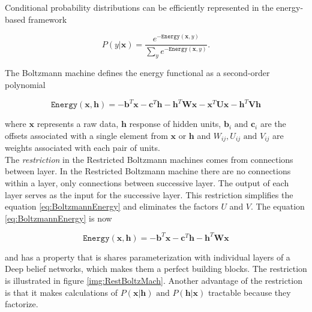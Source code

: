 Conditional probability distributions can be efficiently represented in the energy-based framework

\begin{equation}
	P(y| \mathbf{x}) = \frac{e^{-\mathtt{Energy}(\mathbf{x},y)}}{\sum_y e^{-\mathtt{Energy}(\mathbf{x},y)}}.
\end{equation}

The Boltzmann machine defines the energy functional as a second-order polynomial

\begin{equation}
	\mathtt{Energy}(\mathbf{x}, \mathbf{h}) = -\mathbf{b}^T\mathbf{x} - \mathbf{c}^T\mathbf{h} - \mathbf{h}^T\mathbf{W}\mathbf{x} - \mathbf{x}^T\mathbf{U}\mathbf{x} - \mathbf{h}^T\mathbf{V}\mathbf{h}
	\label{eq:BoltzmannEnergy}
\end{equation}

where $\mathbf{x}$ represents a raw data, $\mathbf{h}$ response of hidden units, $\mathbf{b}_i \text{ and } \mathbf{c}_i$ are the offsets associated with a single element from $\mathbf{x}$ or $\mathbf{h}$ and $W_{ij}, U_{ij} \text{ and } V_{ij}$ are weights associated with each pair of units. \\

The \textit{restriction} in the Restricted Boltzmann machines comes from connections between layer. In the Restricted Boltzmann machine there are no connections within a layer, only connections between successive layer. The output of each layer serves as the input for the successive layer.  This restriction simplifies the equation \ref{eq:BoltzmannEnergy} and eliminates the factors $U$ and $V$. The equation \ref{eq:BoltzmannEnergy} is now

\begin{equation}
	\mathtt{Energy}(\mathbf{x}, \mathbf{h}) = -\mathbf{b}^T\mathbf{x} - \mathbf{c}^T\mathbf{h} - \mathbf{h}^T\mathbf{W}\mathbf{x} 
	\label{eq:RestBoltzmannEnergy}
\end{equation}

and has a property that is shares parameterization with individual layers of a Deep belief networks, which makes them a perfect building blocks. The restriction is illustrated in figure \ref{img:RestBoltzMach}. Another advantage of the restriction is that it makes calculations of $P(\mathbf{x} | \mathbf{h}) \text{ and } P(\mathbf{h} | \mathbf{x})$ tractable because they factorize.

